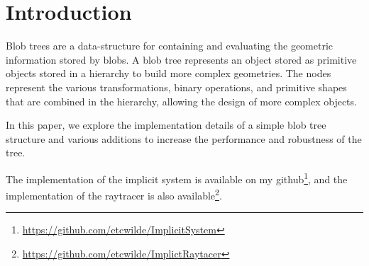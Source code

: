 \documentclass[conference]{acmsiggraph}
\title{\Title}
\author{
	\Author \\
	University of Victoria\\
\Email}
\begin{document}

\maketitle

\begin{abstract}
	Implicit surfaces are a mathematical representation of geometric
	information; storing complex geometric information with minimal memory
	requirements. Blobs are a form of implicit object defined by a central
	origin point, a \fff, and an iso value. The surface is defined at
	radius $r$ when the \fff evaluated on $r$ is equal to the iso value.

	A blob tree is used to build complex geometry from simpler
	primitives. Intelligent construction of the blob-tree is critical for
	fast evaluation of the implicit object represented in the tree, whether
	that be for ray-tracing or polygonization.

\end{abstract}

\keywordlist

\copyrightspace

\section{Introduction}
Blob trees are a data-structure for containing and evaluating the geometric
information stored by blobs. A blob tree represents an object stored as
primitive objects stored in a hierarchy to build more complex geometries. The
nodes represent the various transformations, binary operations, and primitive
shapes that are combined in the hierarchy, allowing the design of more complex
objects.

In this paper, we explore the implementation details of a simple blob tree
structure and various additions to increase the performance and robustness of
the tree.

The implementation of the implicit system is available on my
github\footnote{\url{https://github.com/etcwilde/ImplicitSystem}}, and the
implementation of the raytracer is also
available\footnote{\url{https://github.com/etcwilde/ImplictRaytacer}}.
\end{document}

